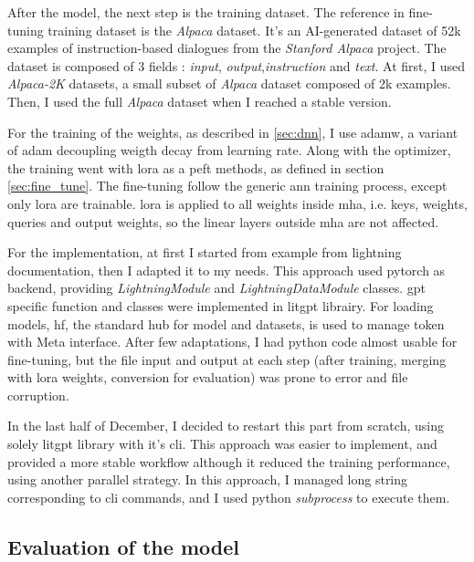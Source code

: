 After the model, the next step is the training dataset. The reference in fine-tuning training dataset is the \textit{Alpaca} dataset\cite{hashimoto_stanford_2024}. It's an AI-generated dataset of 52k examples of instruction-based dialogues from the \textit{Stanford Alpaca} project. The dataset is composed of 3 fields : \textit{input}, \textit{output},\textit{instruction} and \textit{text}. At first, I used \textit{Alpaca-2K} datasets, a small subset of \textit{Alpaca} dataset composed of 2k examples. Then, I used the full \textit{Alpaca} dataset when I reached a stable version. 

For the training of the weights, as described in \ref{sec:dnn}, I use \acrshort{adamw}, a variant of \acrshort{adam} decoupling weigth decay \cite{krogh_simple_1991} from learning rate. Along with the optimizer, the training went with \acrfull{lora} as a \acrfull{peft} methods, as defined in section \ref{sec:fine_tune}. The fine-tuning follow the generic \acrshort{ann} training process, except only \acrshort{lora} are trainable. \acrshort{lora} is applied to all weights inside \acrlong{mha}, i.e. keys, weights, queries and output weights, so the linear layers outside \acrshort{mha} are not affected.

For the implementation, at first I started from example from \gls{lightning} documentation, then I adapted it to my needs. This approach used \gls{pytorch} as backend, providing \textit{LightningModule} and \textit{LightningDataModule} classes. \acrshort{gpt} specific function and classes were implemented in \gls{litgpt} librairy. For loading models, \gls{hf}, the standard hub for model and datasets, is used to manage token with Meta interface. 
After few adaptations, I had python code almost usable for fine-tuning, but the file input and output at each step (after training, merging with \acrshort{lora} weights, conversion for evaluation) was prone to error and file corruption. 

In the last half of December, I decided to restart this part from scratch, using solely \gls{litgpt} library with it's \acrfull{cli}. This approach was easier to implement, and provided a more stable workflow although it reduced the training performance, using another parallel strategy. In this approach, I managed long string corresponding to \acrshort{cli} commands, and I used python \textit{subprocess} to execute them.


\subsection{Evaluation of the model}
\label{sec:model_evaluation}

